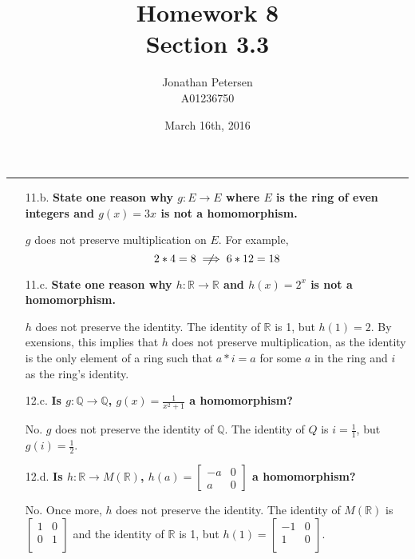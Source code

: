 \documentclass{article}
\title{Homework 8 \\ Section 3.3}
\author{Jonathan Petersen \\ A01236750}
\date{March 16th, 2016}
\begin{document}
	\maketitle
	\hrule 
	\vspace{5mm}
	\begin{enumerate}
		\item [11.b.] \textbf{State one reason why $g:E \rightarrow E$ where $E$ is the ring of
							  even integers and $g(x) = 3x$ is not a homomorphism.}

			$g$ does not preserve multiplication on $E$. For example,
			\begin{equation*}
				2 * 4 = 8 \centernot \implies 6 * 12 = 18
			\end{equation*}

		\item [11.c.] \textbf{State one reason why $h:\mathbb{R} \rightarrow \mathbb{R}$ and 
							  $h(x) = 2^x$ is not a \linebreak homomorphism.}

			$h$ does not preserve the identity. The identity of $\mathbb{R}$ is 1, but $h(1) = 2$.
			By exensions, this implies that $h$ does not preserve multiplication, as the identity
			is the only element of a ring such that $a * i = a$ for some $a$ in the ring and $i$ as
			the ring's identity. 

		\item [12.c.] \textbf{Is $g:\mathbb{Q} \rightarrow \mathbb{Q}$, $g(x) = \frac{1}{x^2 + 1}$ 
							  a homomorphism?}

			No. $g$ does not preserve the identity of $\mathbb{Q}$. The identity of $Q$ is 
			$i = \frac{1}{1}$, but $g(i) = \frac{1}{2}$. 

		\item [12.d.] \textbf{Is $h:\mathbb{R} \rightarrow M(\mathbb{R})$, $h(a) = \begin{bmatrix}
							  -a & 0 \\ a & 0 \end{bmatrix}$ a homomorphism?}

			No. Once more, $h$ does not preserve the identity. The identity of $M(\mathbb{R})$ is 
			$\begin{bmatrix}
				1 & 0 \\
				0 & 1 \\
			\end{bmatrix}$
			and the identity of $\mathbb{R}$ is 1, but $h(1) = 
			\begin{bmatrix}
				-1 & 0 \\
				 1 & 0 \\
			\end{bmatrix}$.


\end{enumerate}
\end{document}
